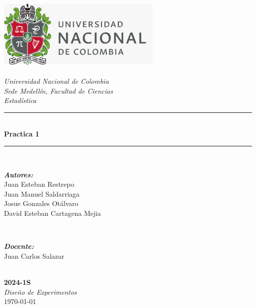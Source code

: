 \begin{titlepage}
\newcommand{\HRule}{\rule{\linewidth}{0.5mm}}
\includegraphics[width=8cm]{Unal.jpeg}\\[0.5cm] 
\center 
\quad\\[1.0cm]
\textsl{\Large Universidad Nacional de Colombia}\\[0.5cm] 
\textsl{\large Sede Medellín, Facultad de Ciencias}\\[0.5cm] 
\textsl{\large Estadística}\\[1.5cm] 
\makeatletter
\HRule \\[0.6cm]
{ \huge \bfseries Practica 1}\\[0.4cm] 
\HRule \\[1.4cm]
\begin{minipage}{0.4\textwidth}
\begin{flushleft} \large
\emph{\textbf{Autores:}}\\
Juan Esteban Restrepo \\
Juan Manuel Saldarriaga\\
Josue Gonzales Otálvaro\\
David Esteban Cartagena Mejia\\
\end{flushleft}
\end{minipage}
~
\begin{minipage}{0.4\textwidth}
\begin{flushright} \large
\emph{\textbf{Docente:}} \\
\textup{Juan Carlos Salazar}
\end{flushright}
\end{minipage}\\[3.2cm]
\makeatother
{\large \textbf{2024-1S}}\\[0.5cm]
{\large \emph{Diseño de Experimentos}}\\[0.6cm]
{\large \today}\\[2cm] 
\vfill 
\end{titlepage}